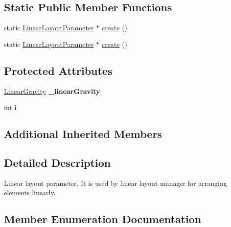 \subsection*{Static Public Member Functions}
\begin{DoxyCompactItemize}
\item 
static \hyperlink{classui_1_1LinearLayoutParameter}{Linear\+Layout\+Parameter} $\ast$ \hyperlink{classui_1_1LinearLayoutParameter_a000ee9879689523f524bc5564109bf81}{create} ()
\item 
static \hyperlink{classui_1_1LinearLayoutParameter}{Linear\+Layout\+Parameter} $\ast$ \hyperlink{classui_1_1LinearLayoutParameter_a8714c9a47d01997fda14816b373948f9}{create} ()
\end{DoxyCompactItemize}
\subsection*{Protected Attributes}
\begin{DoxyCompactItemize}
\item 
\mbox{\label{classui_1_1LinearLayoutParameter_a1823c82538049d3e43a417cf5dcc20fe}} 
\hyperlink{classui_1_1LinearLayoutParameter_a2045fd6c06860357e95bccdf2531fe08}{Linear\+Gravity} {\bfseries \+\_\+linear\+Gravity}
\item 
\mbox{\label{classui_1_1LinearLayoutParameter_a9faea792ccc756715dfdfd06992dd288}} 
int {\bfseries i}
\end{DoxyCompactItemize}
\subsection*{Additional Inherited Members}


\subsection{Detailed Description}
Linear layout parameter. It is used by linear layout manager for arranging elements linearly. 

\subsection{Member Enumeration Documentation}
\mbox{\label{classui_1_1LinearLayoutParameter_a2045fd6c06860357e95bccdf2531fe08}} 
